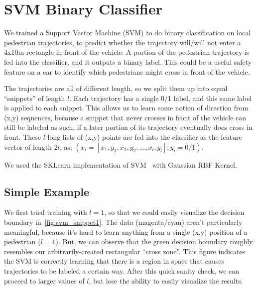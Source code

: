 
\section{SVM Binary Classifier} \label{sec:svm}

We trained a Support Vector Machine (SVM) to do binary classification on local pedestrian trajectories, to predict whether the trajectory will/will not enter a 4x10m rectangle in front of the vehicle.
A portion of the pedestrian trajectory is fed into the classifier, and it outputs a binary label.
This could be a useful safety feature on a car to identify which pedestrians might cross in front of the vehicle.

The trajectories are all of different length, so we split them up into equal ``snippets'' of length $l$.
Each trajectory has a single 0/1 label, and this same label is applied to each snippet.
This allows us to learn some notion of direction from (x,y) sequences, because a snippet that never crosses in front of the vehicle can still be labeled as such, if a later portion of its trajectory eventually does cross in front.
These $l$-long lists of (x,y) points are fed into the classifier as the feature vector of length $2l$, as:
$(x_i = [x_1, y_1, x_2, y_2, ... , x_l, y_l]; y_i = 0/1)$.

We used the SKLearn implementation of SVM~\cite{scikit-learn} with Gaussian RBF Kernel.

\subsection{Simple Example}
We first tried training with $l=1$, so that we could easily visualize the decision boundary in~\cref{fig:svm_snippet1}.
The data (magenta/cyan) aren't particularly meaningful, because it's hard to learn anything from a single (x,y) position of a pedestrian ($l=1$).
But, we can observe that the green decision boundary roughly resembles our arbitrarily-created rectangular ``cross zone''.
This figure indicates the SVM is correctly learning that there is a region in space that causes trajectories to be labeled a certain way.
After this quick sanity check, we can proceed to larger values of $l$, but lose the ability to easily visualize the results.

